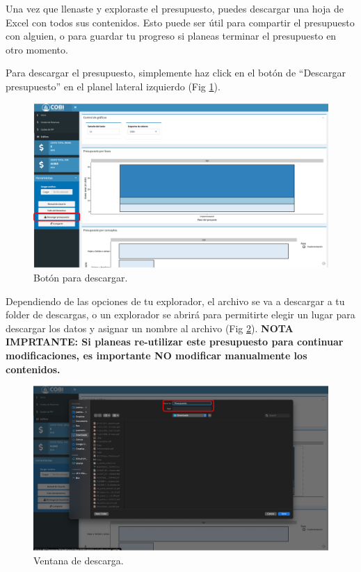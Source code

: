 \documentclass[
]{book}
\begin{document}
Una vez que llenaste y exploraste el presupuesto, puedes descargar una hoja de Excel con todos sus contenidos. Esto puede ser útil para compartir el presupuesto con alguien, o para guardar tu progreso si planeas terminar el presupuesto en otro momento.

Para descargar el presupuesto, simplemente haz click en el botón de ``Descargar presupuesto'' en el planel lateral izquierdo (Fig \ref{fig:down-1}).

\begin{figure}
\centering
\includegraphics{images/down-1.png}
\caption{\label{fig:down-1}Botón para descargar.}
\end{figure}

Dependiendo de las opciones de tu explorador, el archivo se va a descargar a tu folder de descargas, o un explorador se abrirá para permitirte elegir un lugar para descargar los datos y asignar un nombre al archivo (Fig \ref{fig:down-2}). \textbf{NOTA IMPRTANTE: Si planeas re-utilizar este presupuesto para continuar modificaciones, es importante NO modificar manualmente los contenidos.}

\begin{figure}
\centering
\includegraphics{images/down-2.png}
\caption{\label{fig:down-2}Ventana de descarga.}
\end{figure}
\end{document}
